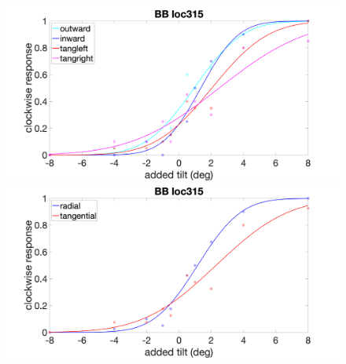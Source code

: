 \documentclass[11pt]{article} %
\begin{document}
\begin{figure}[H]
\centering %
\includegraphics[scale=.15]{Images/BB_PF_loc315_4conds.png}
\includegraphics[scale=.15]{Images/BB_PF_loc315_2conds.png}
\end{figure}


\newpage
\end{document}
